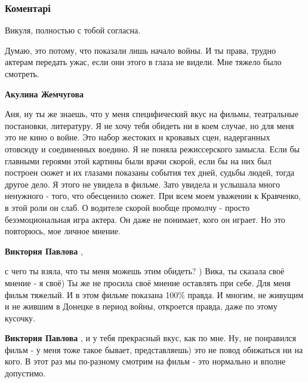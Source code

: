  
 
 
 
 
\subsubsection{Коментарі}

\begin{itemize} %
Викуля, полностью с тобой согласна.


Думаю, это потому, что показали лишь начало войны. И ты права, трудно актерам
передать ужас, если они этого в глаза не видели. Мне тяжело было смотреть.

\begin{itemize} %
\textbf{Акулина Жемчугова} 

Аня, ну ты же знаешь, что у меня специфический вкус на фильмы, театральные
постановки, литературу. Я не хочу тебя обидеть ни в коем случае, но для меня
это не кино о войне. Это набор жестоких и кровавых сцен, надерганных отовсюду и
соединенных воедино. Я не поняла режиссерского замысла. Если бы главными
героями этой картины были врачи скорой, если бы на них был построен сюжет и их
глазами показаны события тех дней, судьбы людей, тогда другое дело. Я этого не
увидела в фильме. Зато увидела и услышала много ненужного - того, что
обесценило сюжет. При всем моем уважении к Кравченко, в этой роли он слаб. О
водителе скорой вообще промолчу - просто безэмоциональная игра актера. Он даже
не понимает, кого он играет. Но это повторюсь, мое личное мнение.


\textbf{Виктория Павлова} , 

с чего ты взяла, что ты меня можешь этим обидеть? ) Вика, ты сказала своё
мнение - я своё) Ты же не просила своё мнение оставлять при себе. Для меня
фильм тяжелый. И в этом фильме показана 100\% правда. И многим, не живущим и не
жившим в Донецке в период войны, откроется правда, даже по этому кусочку.

\textbf{Виктория Павлова} , и у тебя прекрасный вкус, как по мне. Ну, не понравился фильм - у меня тоже такое бывает, представляешь) это не повод обижаться ни на кого. В этот раз мы по-разному смотрим на фильм - это нормально и вполне допустимо.


\end{itemize}
\end{itemize}
